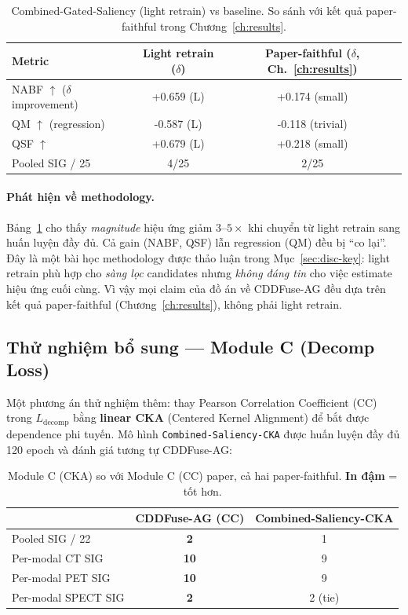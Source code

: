\begin{table}[h]
\centering
\small
\caption{Combined-Gated-Saliency (light retrain) vs baseline. So sánh với kết quả paper-faithful trong Chương~\ref{ch:results}.}
\label{tab:app-combined-light}
\begin{tabular}{lcc}
\toprule
\textbf{Metric} & \textbf{Light retrain ($\delta$)} & \textbf{Paper-faithful ($\delta$, Ch.~\ref{ch:results})} \\
\midrule
NABF $\uparrow$ ($\delta$ improvement) & +0.659 (L) & +0.174 (small) \\
QM $\uparrow$ (regression)             & -0.587 (L) & -0.118 (trivial) \\
QSF $\uparrow$                         & +0.679 (L) & +0.218 (small) \\
Pooled SIG / 25                        & 4/25       & 2/25 \\
\bottomrule
\end{tabular}
\end{table}

\paragraph{Phát hiện về methodology.}
Bảng~\ref{tab:app-combined-light} cho thấy \emph{magnitude} hiệu ứng giảm $3\text{--}5\times$ khi chuyển từ light retrain sang huấn luyện đầy đủ. Cả gain (NABF, QSF) lẫn regression (QM) đều bị ``co lại''. Đây là một bài học methodology được thảo luận trong Mục~\ref{sec:disc-key}: light retrain phù hợp cho \emph{sàng lọc} candidates nhưng \emph{không đáng tin} cho việc estimate hiệu ứng cuối cùng. Vì vậy mọi claim của đồ án về CDDFuse-AG đều dựa trên kết quả paper-faithful (Chương~\ref{ch:results}), không phải light retrain.

\subsection{Thử nghiệm bổ sung --- Module C (Decomp Loss)}
\label{app:moduleC}

Một phương án thử nghiệm thêm: thay Pearson Correlation Coefficient (CC) trong $L_{\mathrm{decomp}}$ bằng \textbf{linear CKA} (Centered Kernel Alignment) \cite{kornblith2019cka} để bắt được dependence phi tuyến. Mô hình \texttt{Combined-Saliency-CKA} được huấn luyện đầy đủ 120 epoch và đánh giá tương tự CDDFuse-AG:

\begin{table}[h]
\centering
\small
\caption{Module C (CKA) so với Module C (CC) paper, cả hai paper-faithful. \textbf{In đậm} = tốt hơn.}
\label{tab:app-moduleC}
\begin{tabular}{lcc}
\toprule
\textbf{} & \textbf{CDDFuse-AG (CC)} & \textbf{Combined-Saliency-CKA} \\
\midrule
Pooled SIG / 22 & \textbf{2} & 1 \\
Per-modal CT SIG  & \textbf{10} & 9 \\
Per-modal PET SIG & \textbf{10} & 9 \\
Per-modal SPECT SIG & \textbf{2}  & 2 (tie) \\
\bottomrule
\end{tabular}
\end{table}

